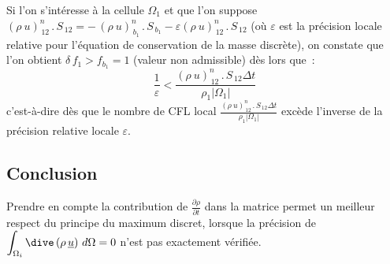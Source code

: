 Si l'on s'int\'eresse \`a la cellule $\Omega_1$ et que l'on
suppose $(\rho\ u)^n_{\,12}\,.\,S_{\,12}=-\,(\rho\
u)^n_{\,b_1}\,.\,S_{\,b_1}-\varepsilon (\rho\ u)^n_{\,12}\,.\,S_{\,12}$ (o\`u
$\varepsilon$ est la pr\'ecision locale relative pour l'\'equation de
conservation de la masse discr\`ete), on constate que l'on obtient $\delta\,f_1
> f_{b_1} = 1 $ (valeur non admissible) d\`es lors que~:
 $$\frac{1}{\varepsilon} < \frac{(\rho\
u)^n_{\,12}\,.\,S_{\,12}\Delta t}{\rho_1|\Omega_1|}$$
c'est-\`a-dire d\`es que
le nombre de CFL local $\displaystyle\frac{(\rho\
u)^n_{\,12}\,.\,S_{\,12}\Delta t}{\rho_1|\Omega_1|}$ exc\`ede l'inverse de la
pr\'ecision relative locale $\varepsilon$.

\subsection*{Conclusion}

Prendre en compte la contribution de
$\displaystyle\frac{\partial \rho}{\partial t}$ dans la matrice permet un meilleur respect du principe du maximum discret, lorsque la
pr\'ecision de $\displaystyle\int_{\Omega_i}\dive\,(\rho\,\underline{u})\
d\Omega = 0$ n'est pas exactement v\'erifi\'ee.
